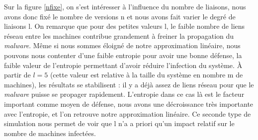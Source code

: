Sur la figure \ref{nfixe}, on s'est intéresser à l'influence du nombre de liaisons, nous avons donc fixé le nombre de versions n et nous avons fait varier le degré de liaisons l. On remarque que pour des petites valeurs l, le faible nombre de liens réseau entre les machines contribue grandement à freiner la propagation du \textit{malware}. Même si nous sommes éloigné de notre approximation linéaire, nous pouvons nous contenter d'une faible entropie pour avoir une bonne défense, la faible valeur de l'entropie permettant d'avoir réduire l'infection du système. À partir de $l=5$ (cette valeur est relative à la taille du système en nombre m de machines), les résultats se stabilisent : il y a déjà assez de liens réseau pour que le \textit{malware} puisse se propager rapidement. L'entropie dans ce cas là est le facteur important comme moyen de défense, nous avons une décroissance très importante avec l'entropie, et l'on retrouve notre approximation linéaire.
Ce seconde type de simulation nous permet de voir que l n’a a priori qu’un impact relatif sur le nombre de machines infectées.

